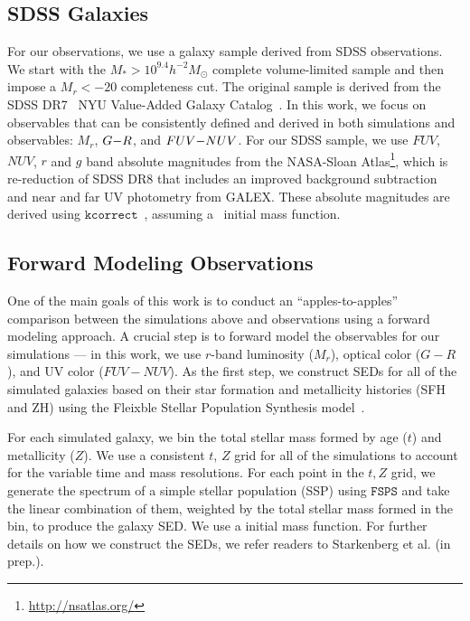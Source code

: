 \subsection{SDSS Galaxies} \label{sec:obs} 
For our observations, we use a galaxy sample derived from SDSS observations. We
start with the $M_* > 10^{9.4} h^{-2}M_\odot$ complete \cite{tinker2011}
volume-limited sample and then impose a $M_r < -20$ completeness cut. 
The original \cite{tinker2011} sample is derived from the SDSS DR7~\citep{abazajian2009} NYU
Value-Added Galaxy Catalog~\citep[VAGC;][]{blanton2005}. In this work, we focus 
on observables that can be consistently defined and derived in both simulations 
and observables: $M_r$, $G{-}R$, and $FUV{-}NUV$. For our SDSS sample, we use $FUV$,
$NUV$, $r$ and $g$ band absolute magnitudes from the NASA-Sloan
Atlas\footnote{\url{http://nsatlas.org/}}, which is re-reduction of SDSS DR8
\citep{aihara2011} that includes an improved background subtraction~\citep{blanton2011} 
and near and far UV photometry from GALEX. These absolute magnitudes are
derived using $\mathtt{kcorrect}$~\citep{blanton2007a}, assuming
a~\cite{chabrier2003} initial mass function. 

\subsection{Forward Modeling Observations} \label{sec:fm} 
One of the main goals of this work is to conduct an ``apples-to-apples'' comparison
between the simulations above and observations using a forward modeling
approach. A crucial step is to forward model the observables for our
simulations --- in this work, we use $r$-band luminosity ($M_r$), optical color ($G-R$), and 
UV color ($FUV-NUV$). As the first step, we construct SEDs for all
of the simulated galaxies based on their star formation and metallicity
histories (SFH and ZH) using the Fleixble Stellar Population Synthesis model~\citep[$\mathtt{FSPS}$;][]{conroy2009, conroy2010}. 

For each simulated galaxy, we bin the total stellar mass formed by age ($t$)
and metallicity ($Z$). We use a consistent $t$, $Z$ grid for all of the simulations
to account for the variable time and mass resolutions. For each point in the
$t, Z$ grid, we generate the spectrum of a simple stellar population (SSP)
using $\mathtt{FSPS}$ and take the linear combination of them, weighted by 
the total stellar mass formed in the bin, to produce the galaxy SED. We use a
\cite{chabrier2003} initial mass function. For further details on how we
construct the SEDs, we refer readers to Starkenberg et al. (in prep.).

